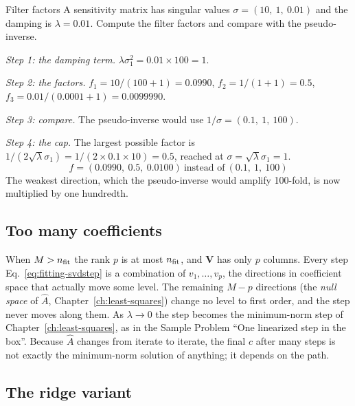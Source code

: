 \begin{sample}{Filter factors}
A sensitivity matrix has singular values $\sigma=(10,\ 1,\ 0.01)$ and the damping is $\lambda=0.01$. Compute the filter factors and compare with the pseudo-inverse.

\emph{Step 1: the damping term.} $\lambda\sigma_1^2=0.01\times100=1$.

\emph{Step 2: the factors.} $f_1=10/(100+1)=0.0990$, $f_2=1/(1+1)=0.5$, $f_3=0.01/(0.0001+1)=0.0099990$.

\emph{Step 3: compare.} The pseudo-inverse would use $1/\sigma=(0.1,\ 1,\ 100)$.

\emph{Step 4: the cap.} The largest possible factor is $1/(2\sqrt\lambda\sigma_1)=1/(2\times0.1\times10)=0.5$, reached at $\sigma=\sqrt\lambda\sigma_1=1$.
\[
\boxed{f=(0.0990,\ 0.5,\ 0.0100)\ \text{instead of}\ (0.1,\ 1,\ 100)}
\]
The weakest direction, which the pseudo-inverse would amplify 100-fold, is now multiplied by one hundredth.
\end{sample}

\subsection{Too many coefficients}

When $M>n_{\rm fit}$ the rank $p$ is at most $n_{\rm fit}$, and $\bm V$ has only $p$ columns. Every step Eq.~\eqref{eq:fitting-svdstep} is a combination of $v_1,\dots,v_p$, the directions in coefficient space that actually move some level. The remaining $M-p$ directions (the \emph{null space} of $\hat A$, Chapter~\ref{ch:least-squares}) change no level to first order, and the step never moves along them. As $\lambda\to0$ the step becomes the minimum-norm step of Chapter~\ref{ch:least-squares}, as in the Sample Problem ``One linearized step in the box''. Because $\hat A$ changes from iterate to iterate, the final $c$ after many steps is not exactly the minimum-norm solution of anything; it depends on the path.

\subsection{The ridge variant}

